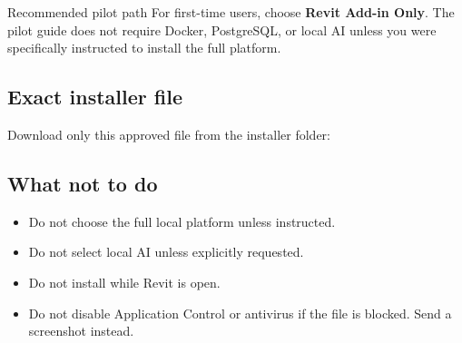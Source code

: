 \begin{tipbox}{Recommended pilot path}
For first-time users, choose \textbf{Revit Add-in Only}. The pilot guide does not require Docker, PostgreSQL, or local AI unless you were specifically instructed to install the full platform.
\end{tipbox}

\subsection*{Exact installer file}
Download only this approved file from the installer folder:
\begin{center}
\end{center}

\subsection*{What not to do}
\begin{itemize}
  \item Do not choose the full local platform unless instructed.
  \item Do not select local AI unless explicitly requested.
  \item Do not install while Revit is open.
  \item Do not disable Application Control or antivirus if the file is blocked. Send a screenshot instead.
\end{itemize}
\clearpage
